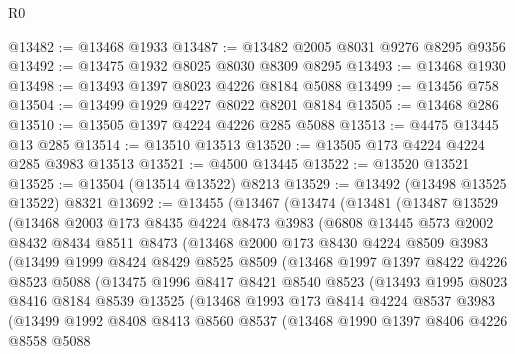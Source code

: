 \begin{lexlean}{R0}
\begin{coremodule}
@13482 := @13468 @1933
@13487 := @13482 @2005 @8031 @9276 @8295 @9356
@13492 := @13475 @1932 @8025 @8030 @8309 @8295
@13493 := @13468 @1930
@13498 := @13493 @1397 @8023 @4226 @8184 @5088
@13499 := @13456 @758
@13504 := @13499 @1929 @4227 @8022 @8201 @8184
@13505 := @13468 @286
@13510 := @13505 @1397 @4224 @4226 @285 @5088
@13513 := @4475 @13445 @13 @285
@13514 := @13510 @13513
@13520 := @13505 @173 @4224 @4224 @285 @3983 @13513
@13521 := @4500 @13445
@13522 := @13520 @13521
@13525 := @13504 (@13514 @13522) @8213
@13529 := @13492 (@13498 @13525 @13522) @8321
@13692 := @13455
    (@13467
      (@13474
        (@13481
          (@13487
            @13529
            (@13468
              @2003
              @173
              @8435
              @4224
              @8473
              @3983
              (@6808
                @13445
                @573
                @2002
                @8432
                @8434
                @8511
                @8473
                (@13468
                  @2000
                  @173
                  @8430
                  @4224
                  @8509
                  @3983
                  (@13499
                    @1999
                    @8424
                    @8429
                    @8525
                    @8509
                    (@13468
                      @1997
                      @1397
                      @8422
                      @4226
                      @8523
                      @5088
                      (@13475
                        @1996
                        @8417
                        @8421
                        @8540
                        @8523
                        (@13493
                          @1995
                          @8023
                          @8416
                          @8184
                          @8539
                          @13525
                          (@13468
                            @1993
                            @173
                            @8414
                            @4224
                            @8537
                            @3983
                            (@13499
                              @1992
                              @8408
                              @8413
                              @8560
                              @8537
                              (@13468
                                @1990
                                @1397
                                @8406
                                @4226
                                @8558
                                @5088

\end{coremodule}
\end{lexlean}
